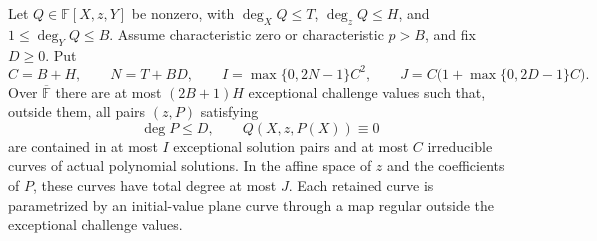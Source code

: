 \begin{lemma}\label{lem:hj-algebraic-root}
Let $Q\in\mathbb F[X,z,Y]$ be nonzero, with
$\deg_XQ\le T$, $\deg_zQ\le H$, and $1\le\deg_YQ\le B$.
Assume characteristic zero or characteristic $p>B$, and fix $D\ge0$.
Put
\[
 C=B+H,\qquad N=T+BD,\qquad
 I=\max\{0,2N-1\}C^2,\qquad
 J=C\bigl(1+\max\{0,2D-1\}C\bigr).
\]
Over $\overline{\mathbb F}$ there are at most $(2B+1)H$ exceptional
challenge values such that, outside them, all pairs $(z,P)$ satisfying
\[
 \deg P\le D,\qquad Q(X,z,P(X))\equiv0
\]
are contained in at most $I$ exceptional solution pairs and at most $C$
irreducible curves of actual polynomial solutions. In the affine space
of $z$ and the coefficients of $P$, these curves have total degree at
most $J$. Each retained curve is parametrized by an initial-value plane
curve through a map regular outside the exceptional challenge values.
\end{lemma}
